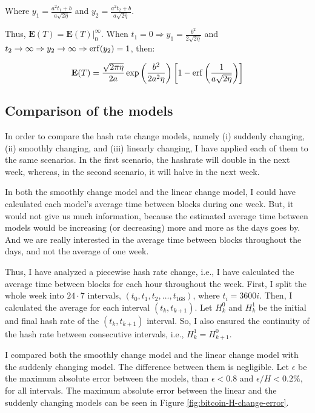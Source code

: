 Where $y_1 = \frac{a^2 t_1 + b}{a \sqrt{2 \eta}}$ and $y_2 = \frac{a^2 t_2 + b}{a \sqrt{2 \eta}}$.

Thus, $\mathbf{E}(T) = \mathbf{E}(T)|_0^\infty$. When $t_1 = 0 \Rightarrow y_1 = \frac{b^2}{2 \sqrt{2 \eta}}$ and $t_2 \rightarrow \infty \Rightarrow y_2 \rightarrow \infty \Rightarrow \operatorname{erf}(y_2) = 1$, then:

$$
\mathbf{E}(T) = \frac{\sqrt{2 \pi \eta}}{2a} \exp \left( \frac{b^2}{2a^2 \eta} \right) \left[1 - \operatorname{erf}\left(\frac{1}{a \sqrt{2 \eta}}\right)\right]
$$


\subsection{Comparison of the models}

In order to compare the hash rate change models, namely (i) suddenly changing, (ii) smoothly changing, and (iii) linearly changing, I have applied each of them to the same scenarios. In the first scenario, the hashrate will double in the next week, whereas, in the second scenario, it will halve in the next week.

In both the smoothly change model and the linear change model, I could have calculated each model's average time between blocks during one week. But, it would not give us much information, because the estimated average time between models would be increasing (or decreasing) more and more as the days goes by. And we are really interested in the average time between blocks throughout the days, and not the average of one week.

Thus, I have analyzed a piecewise hash rate change, i.e., I have calculated the average time between blocks for each hour throughout the week. First, I split the whole week into $24 \cdot 7$ intervals, $(t_0, t_1, t_2, \dots, t_168)$, where $t_i = 3600i$. Then, I calculated the average for each interval $(t_k, t_{k+1})$. Let $H_k^0$ and $H_k^1$ be the initial and final hash rate of the $(t_k, t_{k+1})$ interval. So, I also ensured the continuity of the hash rate between consecutive intervals, i.e., $H_k^1 = H_{k+1}^0$.

I compared both the smoothly change model and the linear change model with the suddenly changing model. The difference between them is negligible. Let $\epsilon$ be the maximum absolute error between the models, than $\epsilon < 0.8$ and $\epsilon/H < 0.2\%$, for all intervals. The maximum absolute error between the linear and the suddenly changing models can be seen in Figure \ref{fig:bitcoin-H-change-error}.

